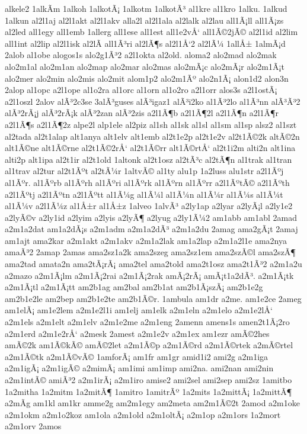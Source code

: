 {alkele2
1alkÃ­m
1alkoh
1alkotÃ¡
1alkotm
1alkotÃ³
al1kre
al1kro
1alku.
1alkud
1alkun
al2l1aj
al2l1akt
al2l1akv
alla2l
al2l1ala
al2lalk
al2lau
all1Ã¡ll
all1Ã¡zs
al2led
all1egy
all1emb
1allerg
all1ese
all1est
all1e2vÅ‘
all1Ã©2jÃ©
al2l1id
al2lim
all1int
al2lip
al2l1isk
al2lÃ­
all1Ã³ri
al2lÃ¶s
al2l1Å‘2
al2lÃ¼
1allÅ±
1almÃ¡d
2alob
al1obe
alogos1s
alo2g1Ã³2
a2l1okta
al2old.
aloma2
alo2mad
alo2mak
alo2m1al
alo2m1an
alo2map
alo2mar
alo2mas
alo2mÃ¡c
alo2mÃ¡r
alo2m1Ã¡t
alo2mer
alo2min
alo2mis
alo2mit
alom1p2
alo2m1Ãº
alo2n1Ã¡
alon1d2
alon3n
2alop
al1opc
a2l1ope
al1o2ra
al1orc
al1orn
al1o2ro
a2l1orr
alos3s
a2l1ostÃ¡
a2l1oszl
2alov
alÃ³2c3se
3alÃ³guses
alÃ³igaz1
alÃ³i2ko
al1Ã³2lo
al1Ã³nn
alÃ³Ã³2
alÃ³2rÃ¡j
alÃ³2rÃ¡k
alÃ³2zan
alÃ³2zis
a2l1Ã¶b
a2l1Ã¶2l
a2l1Ã¶n
a2l1Ã¶r
a2l1Ã¶s
a2l1Ã¶2z
alpe2l
alp1ele
al2piz
al1sh
al1sk
al1sl
al1sm
al1sp
alsz2
al1szt
al2tada
al2t1alap
alt1anya
alt1elv
alt1emb
al2t1e2p
al2t1e2v
al2t1Ã©2k
altÃ©2n
alt1Ã©ne
alt1Ã©rne
al2t1Ã©2rÅ‘
al2t1Ã©rr
alt1Ã©rtÅ‘
al2t1i2m
alti2n
alt1ina
alti2p
alt1ipa
al2t1ir
al2t1old
1altonk
al2t1osz
al2tÃ³c
al2tÃ¶n
al1trak
al1tran
al1trav
al2tur
al2t1Ãºt
al2tÃ¼r
1altvÃ©
al1ty
alu1p
1a2luss
alu1str
a2l1Ãºj
al1Ãºr.
al1Ãºrb
al1Ãºrh
al1Ãºri
al1Ãºrk
al1Ãºrn
al1Ãºrr
a2l1ÃºtÃ©
a2l1Ãºth
a2l1Ãºtj
a2l1Ãºtn
a2l1Ãºtt
al1Ã¼g
al1Ã¼l
al1Ã¼n
al1Ã¼r
al1Ã¼s
al1Ã¼t
al1Ã¼v
a2l1Ã¼z
al1Å±r
al1Å±z
1alveo
1alvÃ³
a2ly1ap
a2lyar
a2lyÃ¡l
a2ly1e2
a2lyÃ©v
a2ly1id
a2lyim
a2lyis
a2lyÃ¶
a2lyug
a2ly1Ã¼2
am1abb
am1abl
2amad
a2m1a2dat
am1a2dÃ¡s
a2m1adm
a2m1a2dÃ³
a2m1a2du
2amag
ama2gÃ¡t
2amaj
am1ajt
ama2kar
a2m1akt
a2m1akv
a2m1a2lak
am1a2lap
a2m1a2l1e
ama2nya
amaÃ³2
2amap
2amas
ama2sz1a2k
ama2szeg
ama2sz1em
ama2szÃ©l
ama2szÃ¶
ama2tad
amata2n
ama2tÃ¡rÃ¡
ama2tel
ama2told
ama2t1osz
ama2t1Ã³2
a2m1a2u
a2mazo
a2m1Ã¡lm
a2m1Ã¡2rai
a2m1Ã¡2rak
amÃ¡2rÃ¡
amÃ¡t1a2dÃ³.
a2m1Ã¡tk
a2m1Ã¡tl
a2m1Ã¡tt
am2b1ag
am2bal
am2b1at
am2b1Ã¡szÃ¡
am2b1e2g
am2b1e2le
am2bep
am2b1e2te
am2b1Ã©r.
1ambula
am1dr
a2me.
am1e2ce
2ameg
am1elÃ¡
am1e2lem
a2m1e2l1i
am1elj
am1elk
a2m1eln
a2m1elo
a2m1e2lÅ‘
a2m1els
a2m1elt
a2m1elv
a2m1e2me
a2m1eng
2amenn
amens1s
amen2t1Ã¡2ro
a2m1erd
a2m1e2rÅ‘
a2mesk
2amest
a2m1e2v
a2m1ex
am1ezr
amÃ©2hes
amÃ©2k
am1Ã©kÃ©
amÃ©2let
a2m1Ã©p
a2m1Ã©rd
a2m1Ã©rtek
a2mÃ©rtel
a2m1Ã©tk
a2m1Ã©vÃ©
1amforÃ¡
am1fr
am1gr
amid1i2
ami2g
a2m1iga
a2m1igÃ¡
a2m1igÃ©
a2mimÃ¡
am1imi
am1imp
ami2na.
ami2nan
ami2nin
a2m1intÃ©
amiÃ³2
a2m1irÃ¡
a2m1iro
amise2
ami2sel
ami2sep
ami2sz
1amitbo
1a2mitha
1a2mitm
1a2mitÃ¶
1amitro
1amitrÃº
1a2mits
1a2mittÃ¡
1a2mittÃ¶
a2mÃ­g
am1kl
am1kr
amme2g
am2m1egy
am2meta
am2m1Ã©2t
2amod
a2m1oke
a2m1okm
a2m1o2koz
am1ola
a2m1old
a2m1oltÃ¡
a2m1op
a2m1ors
1a2mort
a2m1orv
2amos
}
